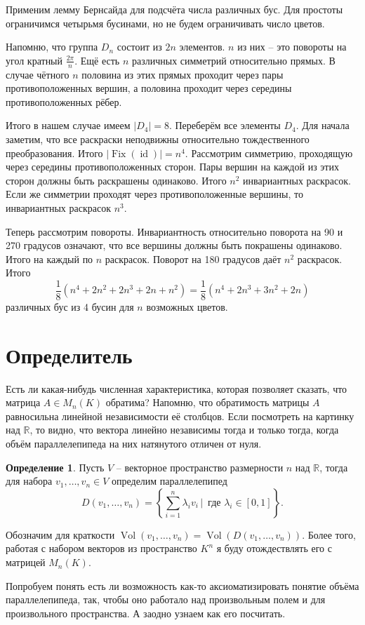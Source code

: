 \documentclass[10pt,a4paper,oneside]{book}
\theoremstyle{definition}
\newtheorem*{defn}{\color{yellow!30!red} Определение}
\newcommand{\mb}[1]{\mathbb{#1}}
\newcommand{\Vol}{\operatorname{Vol}}
\newcommand{\id}{\operatorname{id}}
\newcommand{\Fix}{\operatorname{Fix}}
\def\dfn{\begin{defn}}
\def\edfn{\end{defn}}
\begin{document}
Применим лемму Бернсайда для подсчёта числа различных бус. Для простоты ограничимся четырьмя бусинами, но не будем ограничивать число цветов. 

Напомню, что группа $D_n$ состоит из $2n$ элементов. $n$ из них -- это повороты на угол кратный $\frac{2\pi}{n}$. Ещё есть $n$ различных симметрий относительно прямых. В случае чётного $n$ половина из этих прямых проходит  через пары противоположенных вершин, а половина проходит через середины противоположенных рёбер. 

Итого в нашем случае имеем $|D_4|=8$. Переберём все элементы $D_4$. Для начала заметим, что все раскраски неподвижны относительно тождественного преобразования. Итого $|\Fix(\id)|=n^4$. Рассмотрим симметрию, проходящую через середины противоположенных сторон. Пары вершин на каждой из этих сторон должны быть раскрашены одинаково. Итого $n^2$ инвариантных раскрасок. Если же симметрии проходят через противоположенные вершины, то инвариантных раскрасок $n^3$. 

Теперь рассмотрим повороты. Инвариантность относительно поворота на 90  и 270 градусов означают, что все вершины должны быть покрашены одинаково. Итого на каждый по $n$ раскрасок. Поворот на 180 градусов даёт $n^2$ раскрасок. Итого
$$\frac{1}{8}(n^4+2n^2+2n^3+2n+n^2)=\frac{1}{8}(n^4+2n^3+3n^2+2n)$$
различных бус из 4 бусин для $n$ возможных цветов.


\section{Определитель}

Есть ли какая-нибудь численная характеристика, которая позволяет сказать, что матрица $A\in M_n(K)$ обратима? Напомню, что обратимость матрицы $A$ равносильна линейной независимости её столбцов. Если посмотреть на картинку над $\mb R$, то видно, что вектора линейно независимы тогда и только тогда, когда объём параллелепипеда на них натянутого отличен от нуля.

\dfn Пусть $V$ -- векторное пространство размерности $n$ над $\mb R$, тогда для набора  $v_1,\dots,v_n \in V$ определим параллелепипед
$$D(v_1,\dots,v_n)=\left\{\sum_{i=1}^n \lambda_i v_i\,|\, \text{ где } \lambda_i\in [0,1]\right\}.$$
\edfn


Обозначим для краткости $\Vol(v_1,\dots,v_n)= \Vol (D(v_1,\dots,v_n))$. Более того, работая с набором векторов из пространство $K^n$ я буду отождествлять его с матрицей $M_n(K)$. 

Попробуем понять есть ли возможность как-то аксиоматизировать понятие объёма параллелепипеда, так, чтобы оно работало над произвольным полем и для произвольного пространства. А заодно узнаем как его посчитать.
\end{document}

